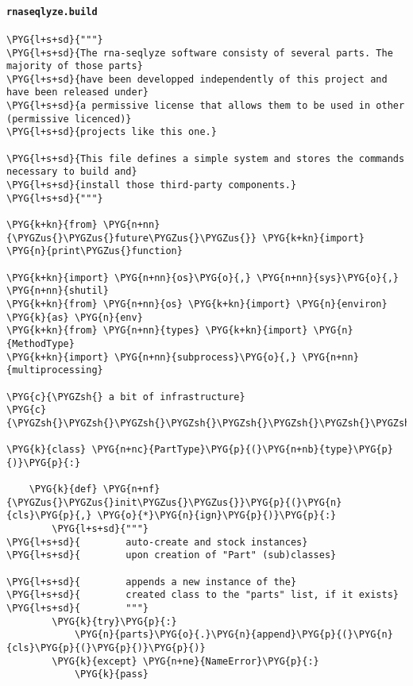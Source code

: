 \paragraph{\texttt{rnaseqlyze.build}}
\label{index-pdf4:rnaseqlyze-build}
\begin{Verbatim}[commandchars=\\\{\}]
\PYG{l+s+sd}{"""}
\PYG{l+s+sd}{The rna-seqlyze software consisty of several parts. The majority of those parts}
\PYG{l+s+sd}{have been developped independently of this project and have been released under}
\PYG{l+s+sd}{a permissive license that allows them to be used in other (permissive licenced)}
\PYG{l+s+sd}{projects like this one.}

\PYG{l+s+sd}{This file defines a simple system and stores the commands necessary to build and}
\PYG{l+s+sd}{install those third-party components.}
\PYG{l+s+sd}{"""}

\PYG{k+kn}{from} \PYG{n+nn}{\PYGZus{}\PYGZus{}future\PYGZus{}\PYGZus{}} \PYG{k+kn}{import} \PYG{n}{print\PYGZus{}function}

\PYG{k+kn}{import} \PYG{n+nn}{os}\PYG{o}{,} \PYG{n+nn}{sys}\PYG{o}{,} \PYG{n+nn}{shutil}
\PYG{k+kn}{from} \PYG{n+nn}{os} \PYG{k+kn}{import} \PYG{n}{environ} \PYG{k}{as} \PYG{n}{env}
\PYG{k+kn}{from} \PYG{n+nn}{types} \PYG{k+kn}{import} \PYG{n}{MethodType}
\PYG{k+kn}{import} \PYG{n+nn}{subprocess}\PYG{o}{,} \PYG{n+nn}{multiprocessing}

\PYG{c}{\PYGZsh{} a bit of infrastructure}
\PYG{c}{\PYGZsh{}\PYGZsh{}\PYGZsh{}\PYGZsh{}\PYGZsh{}\PYGZsh{}\PYGZsh{}\PYGZsh{}\PYGZsh{}\PYGZsh{}\PYGZsh{}\PYGZsh{}\PYGZsh{}\PYGZsh{}\PYGZsh{}\PYGZsh{}\PYGZsh{}\PYGZsh{}\PYGZsh{}\PYGZsh{}\PYGZsh{}\PYGZsh{}\PYGZsh{}\PYGZsh{}\PYGZsh{}}

\PYG{k}{class} \PYG{n+nc}{PartType}\PYG{p}{(}\PYG{n+nb}{type}\PYG{p}{)}\PYG{p}{:}

    \PYG{k}{def} \PYG{n+nf}{\PYGZus{}\PYGZus{}init\PYGZus{}\PYGZus{}}\PYG{p}{(}\PYG{n}{cls}\PYG{p}{,} \PYG{o}{*}\PYG{n}{ign}\PYG{p}{)}\PYG{p}{:}
        \PYG{l+s+sd}{"""}
\PYG{l+s+sd}{        auto-create and stock instances}
\PYG{l+s+sd}{        upon creation of "Part" (sub)classes}

\PYG{l+s+sd}{        appends a new instance of the}
\PYG{l+s+sd}{        created class to the "parts" list, if it exists}
\PYG{l+s+sd}{        """}
        \PYG{k}{try}\PYG{p}{:}
            \PYG{n}{parts}\PYG{o}{.}\PYG{n}{append}\PYG{p}{(}\PYG{n}{cls}\PYG{p}{(}\PYG{p}{)}\PYG{p}{)}
        \PYG{k}{except} \PYG{n+ne}{NameError}\PYG{p}{:}
            \PYG{k}{pass}


\end{Verbatim}
